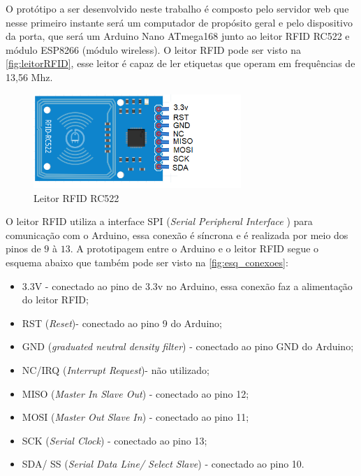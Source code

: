 O protótipo a ser desenvolvido neste trabalho é composto pelo servidor web que nesse primeiro instante será um computador de
propósito geral e pelo dispositivo da porta, que será um Arduino Nano ATmega168 junto ao leitor RFID RC522 e módulo ESP8266 (módulo wireless).
O leitor RFID pode ser visto na \autoref{fig:leitorRFID}, esse leitor é capaz de ler etiquetas que operam em
frequências de 13,56 Mhz.
\begin{figure}[H]
              \caption{\label{fig:leitorRFID}{Leitor RFID RC522}}
              \centering
              \includegraphics[width=0.7\textwidth]{Figuras/rfid_rc522.PNG}
\end{figure}

\par
O leitor RFID utiliza a interface SPI (\textit{Serial Peripheral Interface} ) para comunicação com o Arduino,
essa conexão é síncrona e é realizada por meio dos pinos de $9$ à $13$. A prototipagem entre o Arduino e o leitor RFID
segue o esquema abaixo que também pode ser visto na \autoref{fig:esq_conexoes}:
\begin{itemize}
    \item 3.3V - conectado ao pino de 3.3v no Arduino, essa conexão faz a alimentação do leitor RFID;
    \item RST (\textit{Reset})- conectado ao pino 9 do Arduino;
    \item GND (\textit{graduated neutral density filter}) - conectado ao pino GND do Arduino;
    \item NC/IRQ (\textit{Interrupt Request})- não utilizado;
    \item MISO (\textit{Master In Slave Out}) - conectado ao pino 12;
    \item MOSI  (\textit{Master Out Slave In}) - conectado ao pino 11;
    \item SCK  (\textit{Serial Clock}) - conectado ao pino 13;
    \item SDA/ SS (\textit{Serial Data Line/ Select Slave}) - conectado ao pino 10.
\end{itemize}

